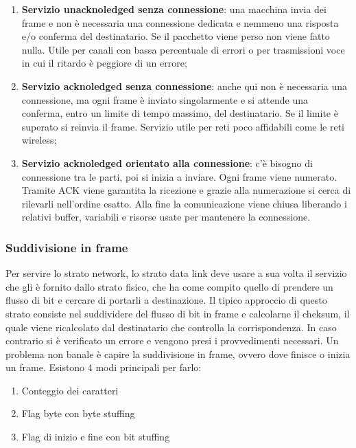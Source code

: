 \begin{enumerate}

\item{\textbf{Servizio unacknoledged senza connessione}: una macchina invia dei frame e non è necessaria una connessione dedicata e nemmeno una risposta e/o conferma del destinatario. Se il pacchetto viene perso non viene fatto nulla. Utile per canali con bassa percentuale di errori o per trasmissioni voce in cui il ritardo è peggiore di un errore};
\item{\textbf{Servizio acknoledged senza connessione}: anche qui non è necessaria una connessione, ma ogni frame è inviato singolarmente e si attende una conferma, entro un limite di tempo massimo, del destinatario. Se il limite è superato si reinvia il frame. Servizio utile per reti poco affidabili come le reti wireless};
\item{\textbf{Servizio acknoledged orientato alla connessione}: c'è bisogno di connessione tra le parti, poi si inizia a inviare. Ogni frame viene numerato. Tramite ACK viene garantita la ricezione e grazie alla numerazione si cerca di rilevarli nell'ordine esatto. Alla fine la comunicazione viene chiusa liberando i relativi buffer, variabili e risorse usate per mantenere la connessione}.

\end{enumerate}

\subsubsection{Suddivisione in frame}

Per servire lo strato network, lo strato data link deve usare a sua volta il servizio che gli è fornito dallo strato fisico, che ha come compito quello di prendere un flusso di bit e cercare di portarli a destinazione.
Il tipico approccio di questo strato consiste nel suddividere del flusso di bit in frame e calcolarne il cheksum, il quale viene ricalcolato dal destinatario che controlla la corrispondenza. In caso contrario si è verificato un errore e vengono presi i provvedimenti necessari. Un problema non banale è capire la suddivisione in frame, ovvero dove finisce o inizia un frame. Esistono 4 modi principali per farlo:

\begin{enumerate}

\item{Conteggio dei caratteri}
\item{Flag byte con byte stuffing}
\item{Flag di inizio e fine con bit stuffing}

\end{enumerate}

